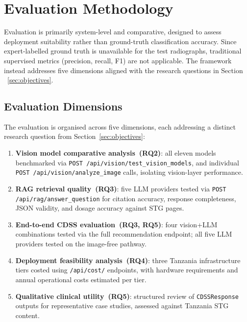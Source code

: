 \documentclass[12pt,a4paper]{report}
\begin{document}
\section{Evaluation Methodology}
\label{sec:eval_method}

Evaluation is primarily system-level and comparative, designed to assess deployment suitability rather than ground-truth classification accuracy. Since expert-labelled ground truth is unavailable for the test radiographs, traditional supervised metrics (precision, recall, F1) are not applicable. The framework instead addresses five dimensions aligned with the research questions in Section ~\ref{sec:objectives}.

\subsection{Evaluation Dimensions}
\label{subsec:dimensions}

The evaluation is organised across five dimensions, each addressing a
distinct research question from Section~\ref{sec:objectives}:

\begin{enumerate}
  \item \textbf{Vision model comparative analysis~(RQ2)}: all eleven
        models benchmarked via \texttt{POST /api/vision/test\_vision\_models}, and individual \texttt{POST /api/vision/analyze\_image} calls,
        isolating vision-layer performance.
  \item \textbf{RAG retrieval quality~(RQ3)}: five LLM providers tested
        via \texttt{POST /api/rag/answer\_question} for citation accuracy,
        response completeness, JSON validity, and dosage accuracy against
        STG pages.
  \item \textbf{End-to-end CDSS evaluation~(RQ3, RQ5)}: four vision+LLM
        combinations tested via the full recommendation endpoint; all
        five LLM providers tested on the image-free pathway.
  \item \textbf{Deployment feasibility analysis~(RQ4)}: three Tanzania
        infrastructure tiers costed using \texttt{/api/cost/} endpoints,
        with hardware requirements and annual operational costs estimated
        per tier.
  \item \textbf{Qualitative clinical utility~(RQ5)}: structured review
        of \texttt{CDSSResponse} outputs for representative case studies,
        assessed against Tanzania STG content.
\end{enumerate}
\end{document}
